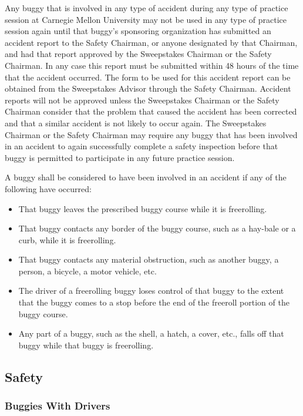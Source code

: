 \documentclass[openany]{book}
\begin{document}
Any buggy that is involved in any type of accident during any type of practice session at Carnegie Mellon University may not be used in any type of practice session again until that buggy's sponsoring organization has submitted an accident report to the Safety Chairman, or anyone designated by that Chairman, and had that report approved by the Sweepstakes Chairman or the Safety Chairman. In any case this report must be submitted within 48 hours of the time that the accident occurred. The form to be used for this accident report can be obtained from the Sweepstakes Advisor through the Safety Chairman. Accident reports will not be approved unless the Sweepstakes Chairman or the Safety Chairman consider that the problem that caused the accident has been corrected and that a similar accident is not likely to occur again. The Sweepstakes Chairman or the Safety Chairman may require any buggy that has been involved in an accident to again successfully complete a safety inspection before that buggy is permitted to participate in any future practice session.

A buggy shall be considered to have been involved in an accident if any of the following have occurred:
\begin{itemize}
	\item That buggy leaves the prescribed buggy course while it is freerolling.
	\item That buggy contacts any border of the buggy course, such as a hay-bale or a curb, while it is freerolling.
	\item That buggy contacts any material obstruction, such as another buggy, a person, a bicycle, a motor vehicle, etc.
	\item The driver of a freerolling buggy loses control of that buggy to the extent that the buggy comes to a stop before the end of the freeroll portion of the buggy course.
	\item Any part of a buggy, such as the shell, a hatch, a cover, etc., falls off that buggy while that buggy is freerolling.
\end{itemize}

\subsection{Safety}

\subsubsection{Buggies With Drivers}
\end{document}
